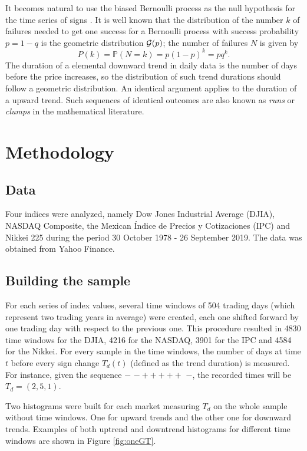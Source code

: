 \documentclass[a4paper]{jpconf}
\begin{document}
It becomes natural to use the biased Bernoulli process as the null hypothesis for the time series of signs \cite{scalasold}. It is well known that the distribution of the number $k$ of failures needed to get one success for a Bernoulli process with success probability $p=1-q$ is the geometric distribution ${\cal{G}}(p)$; the number of failures $N$ is given by
\begin{equation}
P(k)=\mathbb{P}(N=k) = p(1 - p)^{k} = pq^{k}.
\end{equation}
The duration of a elemental downward trend in daily data is the number of days before the price increases, so the distribution of such trend durations should follow a geometric distribution. An identical argument applies to the duration of a upward trend. Such sequences of identical outcomes are also known as {\em runs} or {\em clumps} in the mathematical literature.

\section{Methodology}
\label{methodology}
\subsection{Data}
Four indices were analyzed, namely Dow Jones Industrial Average (DJIA), NASDAQ Composite, the Mexican \'Indice de Precios y Cotizaciones (IPC) and Nikkei 225 during the period 30 October 1978 - 26 September 2019. The data was obtained from Yahoo Finance.

\subsection{Building the sample}
For each series of index values, several time windows of 504 trading days (which represent two trading years in average) were created, each one shifted forward by one trading day with respect to the previous one. This procedure resulted in 4830 time windows for the DJIA, 4216 for the NASDAQ, 3901 for the IPC and 4584 for the Nikkei. For every sample in the time windows, the number of days at time $t$ before every sign change $T_d(t)$ (defined as the trend duration) is measured. For instance, given the sequence $-$ $ - + + + + + $ $-$, the recorded times will be $T_d = (2,5,1)$.

Two histograms were built for each market measuring $T_d$ on the whole sample without time windows. One for upward trends and the other one for downward trends. Examples of both uptrend and downtrend histograms for different time windows are shown in Figure \ref{fig:oneGT}.
\end{document}
